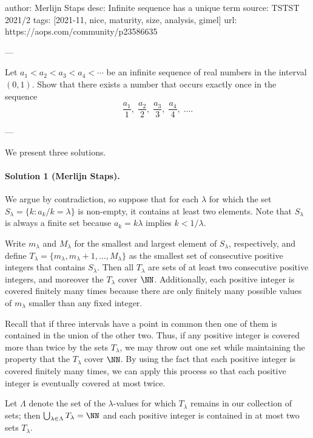 author: Merlijn Staps
desc: Infinite sequence has a unique term
source: TSTST 2021/2
tags: [2021-11, nice, maturity, size, analysis, gimel]
url: https://aops.com/community/p23586635

---

Let $a_1 < a_2 < a_3 < a_4 < \dotsb$ be an
infinite sequence of real numbers in the interval $(0,1)$.
Show that there exists a number that occurs exactly once in the sequence
\[ \frac{a_1}{1}, \; \frac{a_2}{2}, \; \frac{a_3}{3}, \; \frac{a_4}{4}, \; \dots. \]

---

We present three solutions.
\paragraph{Solution 1 (Merlijn Staps).}
We argue by contradiction, so suppose that for each $\lambda$ for which the set
$S_\lambda = \{k : a_k/k = \lambda\}$ is  non-empty, it contains at least two
elements.  Note that $S_\lambda$ is always a finite set because  $a_k =
k\lambda$ implies $k < 1/\lambda$.

Write $m_\lambda$ and $M_\lambda$ for the smallest and largest element of
$S_\lambda$,  respectively, and define $T_\lambda = \{m_\lambda,
m_\lambda+1,\dots,M_\lambda\}$ as the smallest set of consecutive positive
integers  that contains $S_\lambda$.  Then all $T_\lambda$ are sets of at least
two consecutive positive integers, and moreover the $T_\lambda$ cover
$\NN$. Additionally, each positive integer is covered finitely many times
because there are only finitely many possible values of $m_{\lambda}$ smaller
than any fixed integer.

Recall that if three intervals have a point in common then one
of them is contained in the union of the other two. Thus, if any positive
integer is covered more than twice by the sets $T_{\lambda}$, we may throw out
one set while maintaining the property that the $T_{\lambda}$
cover $\NN$. By using the fact that each positive integer is covered
finitely many times, we can apply this process so that each positive integer is
eventually covered at most twice.

Let $\Lambda$ denote the set
of the $\lambda$-values for which $T_\lambda$ remains in our collection of sets;
then $\bigcup_{\lambda \in \Lambda} T_\lambda = \NN$ and each positive
integer is contained in at most two sets $T_\lambda$.

